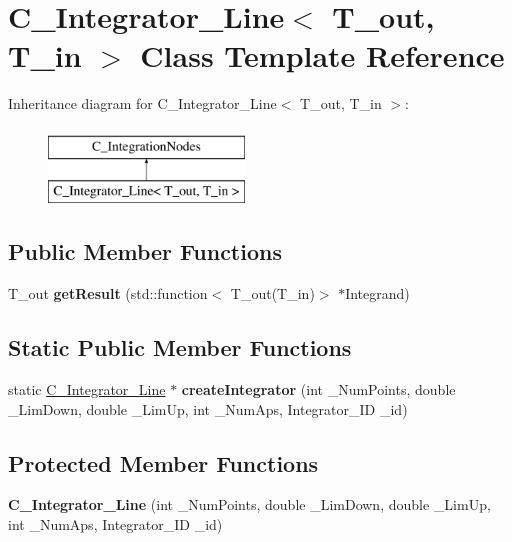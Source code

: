 \hypertarget{class_c___integrator___line}{\section{C\-\_\-\-Integrator\-\_\-\-Line$<$ T\-\_\-out, T\-\_\-in $>$ Class Template Reference}
\label{class_c___integrator___line}
}
Inheritance diagram for C\-\_\-\-Integrator\-\_\-\-Line$<$ T\-\_\-out, T\-\_\-in $>$\-:\begin{figure}[H]
\begin{center}
\leavevmode
\includegraphics[height=2.000000cm]{class_c___integrator___line}
\end{center}
\end{figure}
\subsection*{Public Member Functions}
\begin{DoxyCompactItemize}
\item 
\hypertarget{class_c___integrator___line_a36990ef563e884b91912f8050ab85fff}{T\-\_\-out {\bfseries get\-Result} (std\-::function$<$ T\-\_\-out(T\-\_\-in)$>$ $\ast$Integrand)}\label{class_c___integrator___line_a36990ef563e884b91912f8050ab85fff}

\end{DoxyCompactItemize}
\subsection*{Static Public Member Functions}
\begin{DoxyCompactItemize}
\item 
\hypertarget{class_c___integrator___line_a39a1ca043cff260ffe3fa4e7bc61c5e7}{static \hyperlink{class_c___integrator___line}{C\-\_\-\-Integrator\-\_\-\-Line} $\ast$ {\bfseries create\-Integrator} (int \-\_\-\-Num\-Points, double \-\_\-\-Lim\-Down, double \-\_\-\-Lim\-Up, int \-\_\-\-Num\-Aps, Integrator\-\_\-\-I\-D \-\_\-id)}\label{class_c___integrator___line_a39a1ca043cff260ffe3fa4e7bc61c5e7}

\end{DoxyCompactItemize}
\subsection*{Protected Member Functions}
\begin{DoxyCompactItemize}
\item 
\hypertarget{class_c___integrator___line_a296717ff620c356cbe2b16b3cca73d16}{{\bfseries C\-\_\-\-Integrator\-\_\-\-Line} (int \-\_\-\-Num\-Points, double \-\_\-\-Lim\-Down, double \-\_\-\-Lim\-Up, int \-\_\-\-Num\-Aps, Integrator\-\_\-\-I\-D \-\_\-id)}\label{class_c___integrator___line_a296717ff620c356cbe2b16b3cca73d16}

\end{DoxyCompactItemize}
